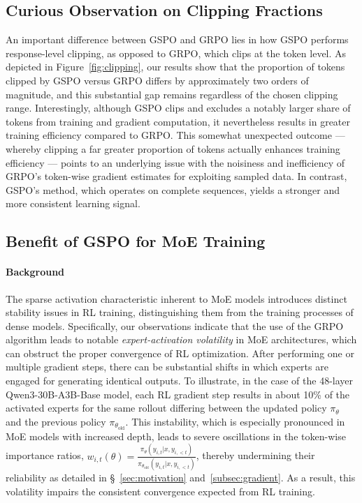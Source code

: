 \subsection{Curious Observation on Clipping Fractions}

An important difference between GSPO and GRPO lies in how GSPO performs response-level clipping, as opposed to GRPO, which clips at the token level. As depicted in Figure~\ref{fig:clipping}, our results show that the proportion of tokens clipped by GSPO versus GRPO differs by approximately two orders of magnitude, and this substantial gap remains regardless of the chosen clipping range. Interestingly, although GSPO clips and excludes a notably larger share of tokens from training and gradient computation, it nevertheless results in greater training efficiency compared to GRPO. This somewhat unexpected outcome — whereby clipping a far greater proportion of tokens actually enhances training efficiency — points to an underlying issue with the noisiness and inefficiency of GRPO’s token-wise gradient estimates for exploiting sampled data. In contrast, GSPO’s method, which operates on complete sequences, yields a stronger and more consistent learning signal.

\subsection{Benefit of GSPO for MoE Training}
\label{subsec:routing_replay}

\paragraph{Background}
The sparse activation characteristic inherent to MoE models introduces distinct stability issues in RL training, distinguishing them from the training processes of dense models. Specifically, our observations indicate that the use of the GRPO algorithm leads to notable \textit{expert-activation volatility} in MoE architectures, which can obstruct the proper convergence of RL optimization. After performing one or multiple gradient steps, there can be substantial shifts in which experts are engaged for generating identical outputs. To illustrate, in the case of the 48-layer Qwen3-30B-A3B-Base model, each RL gradient step results in about 10\% of the activated experts for the same rollout differing between the updated policy $\pi_{\theta}$ and the previous policy $\pi_{\theta_\text{old}}$. This instability, which is especially pronounced in MoE models with increased depth, leads to severe oscillations in the token-wise importance ratios, $w_{i,t}(\theta) = \frac{ \pi_{\theta} (y_{i,t} | x, y_{i,<t}) }{ \pi_{\theta_\text{old}} (y_{i,t} | x,y_{i,<t})}$, thereby undermining their reliability as detailed in \S~\ref{sec:motivation} and~\ref{subsec:gradient}. As a result, this volatility impairs the consistent convergence expected from RL training.


